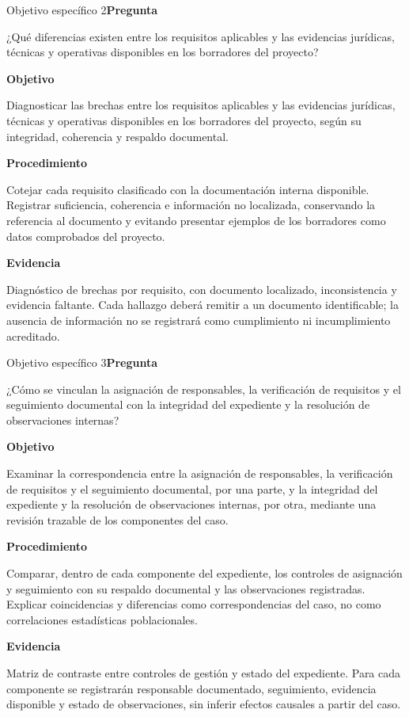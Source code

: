 \documentclass[aspectratio=169,11pt]{beamer}
\begin{document}
\begin{frame}{Objetivo específico 2}\small\textbf{Pregunta}\par ¿Qué diferencias existen entre los requisitos aplicables y las evidencias jurídicas, técnicas y operativas disponibles en los borradores del proyecto?\par\medskip\textbf{Objetivo}\par Diagnosticar las brechas entre los requisitos aplicables y las evidencias jurídicas, técnicas y operativas disponibles en los borradores del proyecto, según su integridad, coherencia y respaldo documental.\par\medskip\textbf{Procedimiento}\par Cotejar cada requisito clasificado con la documentación interna disponible. Registrar suficiencia, coherencia e información no localizada, conservando la referencia al documento y evitando presentar ejemplos de los borradores como datos comprobados del proyecto.\par\medskip\textbf{Evidencia}\par Diagnóstico de brechas por requisito, con documento localizado, inconsistencia y evidencia faltante. Cada hallazgo deberá remitir a un documento identificable; la ausencia de información no se registrará como cumplimiento ni incumplimiento acreditado.\end{frame}
\begin{frame}{Objetivo específico 3}\small\textbf{Pregunta}\par ¿Cómo se vinculan la asignación de responsables, la verificación de requisitos y el seguimiento documental con la integridad del expediente y la resolución de observaciones internas?\par\medskip\textbf{Objetivo}\par Examinar la correspondencia entre la asignación de responsables, la verificación de requisitos y el seguimiento documental, por una parte, y la integridad del expediente y la resolución de observaciones internas, por otra, mediante una revisión trazable de los componentes del caso.\par\medskip\textbf{Procedimiento}\par Comparar, dentro de cada componente del expediente, los controles de asignación y seguimiento con su respaldo documental y las observaciones registradas. Explicar coincidencias y diferencias como correspondencias del caso, no como correlaciones estadísticas poblacionales.\par\medskip\textbf{Evidencia}\par Matriz de contraste entre controles de gestión y estado del expediente. Para cada componente se registrarán responsable documentado, seguimiento, evidencia disponible y estado de observaciones, sin inferir efectos causales a partir del caso.\end{frame}
\end{document}
